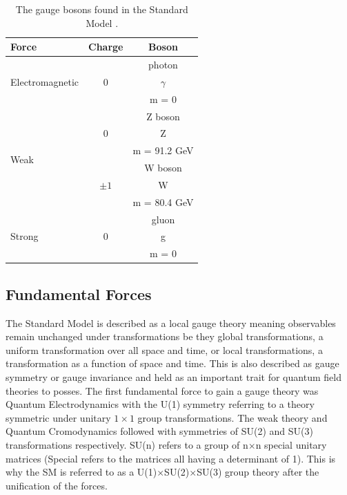     \begin {table}[h]
      \begin{center}
      \begin{tabular}{|l|c|c|}
         \hline
         Force & Charge & Boson \\
         \hline
         \multirow{3}{*}{Electromagnetic} & \multirow{3}{*}{\Large 0} & photon \\
         & & {\Huge $\gamma$} \\
         & & m = 0 \\
         \hline
         \multirow{6}{*}{Weak} & \multirow{3}{*}{\Large 0} & Z boson \\
         & & {\Huge Z} \\
         & & m = 91.2 GeV \\
         \cline{2-3}
         & \multirow{3}{*}{\Large $\pm1$} & W boson \\
         & & {\Huge W} \\
         & & m = 80.4 GeV \\
         \hline
         \multirow{3}{*}{Strong} & \multirow{3}{*}{\Large 0} & gluon \\
         & & {\Huge g} \\
         & & m = 0 \\
         \hline
      \end{tabular}
      \caption{The gauge bosons found in the Standard Model \cite{ulrik:GriffEP2008}.}
      \label{tab:bosons}
      \end{center}
    \end {table}



    \subsection{Fundamental Forces}
    The Standard Model is described as a local gauge theory meaning observables remain unchanged under transformations be they global transformations, a uniform transformation over all space and time, or local transformations, a transformation as a function of space and time. This is also described as gauge symmetry or gauge invariance and held as an important trait for quantum field theories to posses. The first fundamental force to gain a gauge theory was Quantum Electrodynamics with the U(1) symmetry referring to a theory symmetric under unitary $1\times1$ group transformations. The weak theory and Quantum Cromodynamics followed with symmetries of SU(2) and SU(3) transformations respectively. SU(n) refers to a group of n$\times$n special unitary matrices (Special refers to the matrices all having a determinant of 1). This is why the SM is referred to as a U(1)$\times$SU(2)$\times$SU(3) group theory after the unification of the forces.


